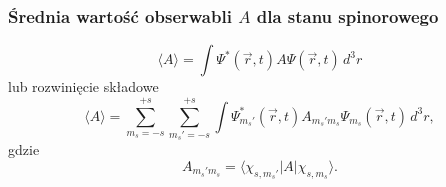 \subsubsection*{Średnia wartość obserwabli $A$ dla stanu spinorowego}
$$
\langle A \rangle = \int \Psi^*(\vec{r}, t) A \Psi(\vec{r}, t) \, d^3r
$$
lub rozwinięcie składowe
$$
\langle A \rangle = \sum_{m_s=-s}^{+s} \sum_{m_s'=-s}^{+s} \int \Psi_{m_s'}^*(\vec{r}, t) A_{m_s' m_s} \Psi_{m_s}(\vec{r}, t) \, d^3r,
$$
gdzie
$$
A_{m_s' m_s} = \langle \chi_{s, m_s'} | A | \chi_{s, m_s} \rangle.
$$
